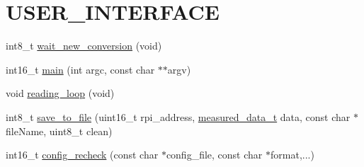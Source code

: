 \hypertarget{a00002}{\section{U\-S\-E\-R\-\_\-\-I\-N\-T\-E\-R\-F\-A\-C\-E}
\label{d7/d46/a00002}
}




  


\begin{DoxyCompactItemize}
\item 
int8\-\_\-t \hyperlink{a00002_ga7b6d584350762c53419945480d6958d3}{wait\-\_\-new\-\_\-conversion} (void)
\begin{DoxyCompactList}\small\item\em 

 \end{DoxyCompactList}\end{DoxyCompactItemize}
\begin{DoxyCompactItemize}
\item 
int16\-\_\-t \hyperlink{a00002_ga3ba649a584853038d5fd50ad1751379d}{main} (int argc, const char $\ast$$\ast$argv)
\begin{DoxyCompactList}\small\item\em 

 \end{DoxyCompactList}\end{DoxyCompactItemize}
\begin{DoxyCompactItemize}
\item 
void \hyperlink{a00002_gaeb3af492d3421787fcbb2cd1bbbaf62c}{reading\-\_\-loop} (void)
\begin{DoxyCompactList}\small\item\em 

 \end{DoxyCompactList}\end{DoxyCompactItemize}
\begin{DoxyCompactItemize}
\item 
int8\-\_\-t \hyperlink{a00002_ga9e259879c5d746107c4a70fe08aba924}{save\-\_\-to\-\_\-file} (uint16\-\_\-t rpi\-\_\-address, \hyperlink{a00028}{measured\-\_\-data\-\_\-t} data, const char $\ast$file\-Name, uint8\-\_\-t clean)
\begin{DoxyCompactList}\small\item\em 

 \end{DoxyCompactList}\end{DoxyCompactItemize}
\begin{DoxyCompactItemize}
\item 
int16\-\_\-t \hyperlink{a00002_gac93e16d1e9d6a04b52373bf3428cc79c}{config\-\_\-recheck} (const char $\ast$config\-\_\-file, const char $\ast$format,...)
\begin{DoxyCompactList}\small\item\em 

 \end{DoxyCompactList}\end{DoxyCompactItemize}



